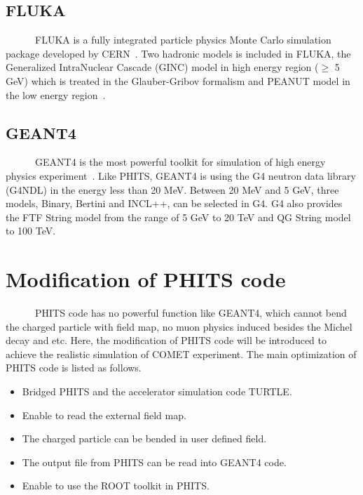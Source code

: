   \subsection{FLUKA}
~~~~~~FLUKA is a fully integrated particle physics Monte Carlo simulation package developed by CERN~\cite{fluka}.
Two hadronic models is included in FLUKA, the Generalized IntraNuclear Cascade (GINC) model in high energy region ($\ge$ 5 GeV) which is treated in the Glauber-Gribov formalism and PEANUT model in the low energy region~\cite{fluka2}.

  \subsection{GEANT4}
~~~~~~GEANT4 is the most powerful toolkit for simulation of high energy physics experiment~\cite{geant4}.
Like PHITS, GEANT4 is using the G4 neutron data library (G4NDL) in the energy less than 20 MeV.
Between 20 MeV and 5 GeV, three models, Binary, Bertini and INCL++, can be selected in G4.
G4 also provides the FTF String model from the range of 5 GeV to 20 TeV and QG String model to 100 TeV.

 \section{Modification of PHITS code}
~~~~~~PHITS code has no powerful function like GEANT4, which cannot bend the charged particle with field map, no muon physics induced besides the Michel decay and etc.
Here, the modification of PHITS code will be introduced to achieve the realistic simulation of COMET experiment.
The main optimization of PHITS code is listed as follows.
\begin{itemize}
 \setlength{\itemsep}{-5pt}
 \item Bridged PHITS and the accelerator simulation code TURTLE.
 \item Enable to read the external field map.
 \item The charged particle can be bended in user defined field.
 \item The output file from PHITS can be read into GEANT4 code.
 \item Enable to use the ROOT toolkit in PHITS.
\end{itemize}

